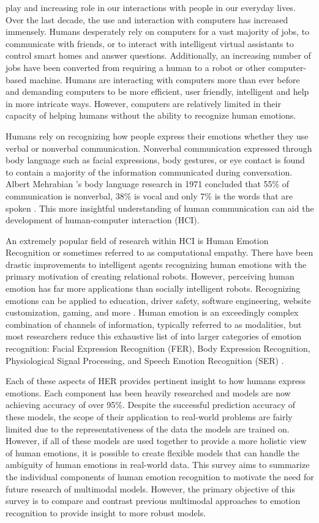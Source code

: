  play and increasing role in our interactions with people in our everyday lives. Over the last decade, the use and interaction with computers has increased immensely. Humans desperately rely on computers for a vast majority of jobs, to communicate with friends, or to interact with intelligent virtual assistants to control smart homes and answer questions. Additionally, an increasing number of jobs have been converted from requiring a human to a robot or other computer-based machine. Humans are interacting with computers more than ever before and demanding computers to be more efficient, user friendly, intelligent and help in more intricate ways. However, computers are relatively limited in their capacity of helping humans without the ability to recognize human emotions. 

Humans rely on recognizing how people express their emotions whether they use verbal or nonverbal communication. Nonverbal communication expressed through body language such as facial expressions, body gestures, or eye contact is found to contain a majority of the information communicated during conversation. Albert Mehrabian 's body language research in 1971 concluded that 55\% of communication is nonverbal, 38\% is vocal and only 7\% is the words that are spoken \cite{mehrabian-1971}. This more insightful understanding of human communication can aid the development of human-computer interaction (HCI).

An extremely popular field of research within HCI is Human Emotion Recognition or sometimes referred to as computational empathy. There have been drastic improvements to intelligent agents recognizing human emotions with the primary motivation of creating relational robots. However, perceiving human emotion has far more applications than socially intelligent robots. Recognizing emotions can be applied to education, driver safety, software engineering, website customization, gaming, and more \cite{vinola-2015}\cite{kołakowska-2014}. Human emotion is an exceedingly complex combination of channels of information, typically referred to as modalities, but most researchers reduce this exhaustive list of into larger categories of emotion recognition: Facial Expression Recognition (FER), Body Expression Recognition, Physiological Signal Processing, and Speech Emotion Recognition (SER) \cite{saxena-2020}\cite{hatem-2022}\cite{heredia-2022}.

Each of these aspects of HER provides pertinent insight to how humans express emotions. Each component has been heavily researched and models are now achieving accuracy of over 95\%. Despite the successful prediction accuracy of these models, the scope of their application to real-world problems are fairly limited due to the representativeness of the data the models are trained on. However, if all of these models are used together to provide a more holistic view of human emotions, it is possible to create flexible models that can handle the ambiguity of human emotions in real-world data. This survey aims to summarize the individual components of human emotion recognition to motivate the need for future research of multimodal models. However, the primary objective of this survey is to compare and contrast previous multimodal approaches to emotion recognition to provide insight to more robust models.  